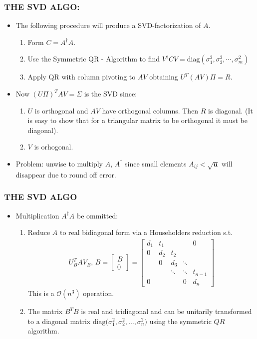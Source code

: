\documentclass[a4paper,8pt]{beamer} %
\newcommand{\ts}[1]{\textbf{#1}}
\newcommand{\diag}[1]{\text{diag}{#1}}
\newcommand{\smatrix}[1]{\left[\begin{matrix} #1 \end{matrix}\right]}
\begin{document}
\begin{frame}%
\frametitle{THE SVD ALGO:}
\begin{itemize}
	\item The following procedure will produce a SVD-factorization of $A$. 
		\begin{enumerate}
			\item Form $C=A^\dagger A$.
			\item Use the Symmetric QR - Algorithm to find 
				$V^\dagger CV = \diag{(\sigma_{1}^2,\sigma_{2}^2,\cdots,\sigma_{m}^2)}$
			\item Apply QR with column pivoting to $AV$  obtaining $U^T(AV)\Pi=R$.
		\end{enumerate}
	\item Now  $(U\Pi)^T A V = \Sigma$ is the SVD since:
		\begin{enumerate}
			\item $U$ is orthogonal and $AV$ have orthogonal columns. Then $R$ is diagonal.  
				(It is easy to show that for a triangular matrix to be orthogonal it must be diagonal).
			\item $V$ is orhogonal.
		\end{enumerate}
	\item Problem: unwise to multiply $A,\,A^\dagger$ since small elements  
		$A_{ij}<\sqrt{\ts u}$ will disappear due to round off error.
\end{itemize}
\end{frame}%

\begin{frame}%
	\frametitle{THE SVD ALGO}
	\begin{itemize}
		\item Multiplication $A^\dagger A$ be ommitted:
			\begin{enumerate}
				\item Reduce $A$ to real bidiagonal form via a Householders reduction s.t. 
					\begin{align}
						U_B^T A V_B ,\, B= \smatrix{B\\0} = 
						\smatrix{
							d_1 & t_1 & & & 0\\
							0 & d_2 & t_2 & & \\
							& 0 & d_3 & \ddots & \\
							& & \ddots	& \ddots & t_{n-1} \\
							0& & & 0& d_n 
						}
					\end{align}
					This is a $\mathcal O(n^3)$ operation.
				\item The matrix $B^TB$ is real and tridiagonal and can be unitarily transformed to a diagonal matrix 
						$\diag (\sigma_1^2, \sigma_2^2,\dots, \sigma_n^2)$ using the symmetric $QR$ algorithm.
			\end{enumerate}
	\end{itemize}
\end{frame}%
\end{document}
